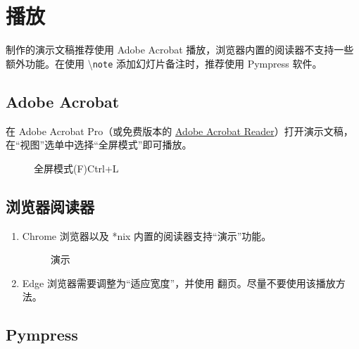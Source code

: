\documentclass[
    UTF8,
    heading=true,
    12pt,
    a4paper
]{ctexrep}
\newcommand{\cmd}[1]{\textbackslash{}\texttt{#1}}
\begin{document}
\chapter{播放}

制作的演示文稿推荐使用 Adobe Acrobat 播放，浏览器内置的阅读器不支持一些额外功能。在使用 \cmd{note} 添加幻灯片备注时，推荐使用 Pympress 软件。

\section{Adobe Acrobat}

在 Adobe Acrobat Pro（或免费版本的 \href{https://www.adobe.com/cn/acrobat/pdf-reader.html}{Adobe Acrobat Reader}）打开演示文稿，在“视图”选单中选择“全屏模式”即可播放。

\begin{figure}[h]
  \centering
  \begin{tcolorbox}[enhanced, title={视图(V)}, attach boxed title to top left, boxed title style={sharp corners}, sharp corners, tile, width=6cm]
    \faTv{} 全屏模式(F)\hfill Ctrl+L
  \end{tcolorbox}
\end{figure}

\section{浏览器阅读器}

\begin{enumerate}
  \item[\faChrome] Chrome 浏览器以及 *nix 内置的阅读器支持“演示”功能。
        \begin{figure}[h]
          \centering
          \begin{tcolorbox}[enhanced, title={$\vdots$}, attach boxed title to top right, boxed title style={circular arc,top=0mm,bottom=2mm,left=3.25mm,right=3.25mm}, sharp corners, tile, width=6cm]
            演示
          \end{tcolorbox}
        \end{figure}
  \item[\faInternetExplorer] Edge 浏览器需要调整为“适应宽度”\fbox{\faArrowsAltH}，并使用  翻页。尽量不要使用该播放方法。
\end{enumerate}

\section{Pympress}
\end{document}
